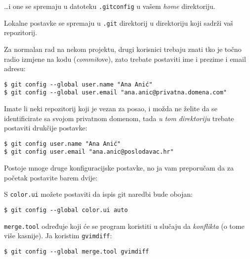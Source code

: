 \dots{}i one se spremaju u datoteku \verb+.gitconfig+ u vašem \emph{home} direktoriju.

Lokalne postavke se spremaju u \verb+.git+ direktorij u direktoriju koji sadrži vaš repozitorij.

Za normalan rad na nekom projektu, drugi korisnici trebaju znati tko je točno radio izmjene na kodu (\emph{commit}ove), zato trebate postaviti ime i prezime i email adresu:

\begin{verbatim}
$ git config --global user.name "Ana Anić"
$ git config --global user.email "ana.anic@privatna.domena.com"
\end{verbatim}

Imate li neki repozitorij koji je vezan za posao, i možda ne želite da se identificirate sa svojom privatnom domenom, tada \emph{u tom direktoriju} trebate postaviti drukčije postavke:

\begin{verbatim}
$ git config user.name "Ana Anić"
$ git config user.email "ana.anic@poslodavac.hr"
\end{verbatim}

Postoje mnoge druge konfiguracijske postavke, no ja vam preporučam da za početak postavite barem dvije:

S \verb+color.ui+ možete postaviti da ispis git naredbi bude obojan:

\begin{verbatim}
$ git config --global color.ui auto
\end{verbatim}

\verb+merge.tool+ određuje koji će se program koristiti u slučaju da \emph{konflikta} (o tome više kasnije). Ja koristim \verb+gvimdiff+:

\begin{verbatim}
$ git config --global merge.tool gvimdiff
\end{verbatim}


